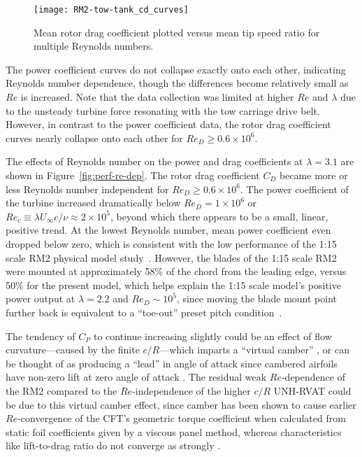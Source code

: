 \begin{figure}
    \centering

    \texttt{[image: RM2-tow-tank\_cd\_curves]}
    
    \caption{Mean rotor drag coefficient plotted versus mean tip speed ratio for
        multiple Reynolds numbers.}
    
    \label{fig:cd-curves}
\end{figure}

The power coefficient curves do not collapse exactly onto each other, indicating
Reynolds number dependence, though the differences become relatively small as
$Re$ is increased. Note that the data collection was limited at higher $Re$ and
$\lambda$ due to the unsteady turbine force resonating with the tow carriage
drive belt. However, in contrast to the power coefficient data, the rotor drag
coefficient curves nearly collapse onto each other for $Re_D \ge 0.6 \times
10^6$.

The effects of Reynolds number on the power and drag coefficients at
$\lambda=3.1$ are shown in Figure~\ref{fig:perf-re-dep}. The rotor drag
coefficient $C_D$ became more or less Reynolds number independent for $Re_D \ge
0.6 \times 10^6$. The power coefficient of the turbine increased dramatically
below $Re_D = 1 \times 10^6$ or $Re_c \equiv \lambda U_\infty c / \nu \approx 2
\times 10^5$, beyond which there appears to be a small, linear, positive trend.
At the lowest Reynolds number, mean power coefficient even dropped below zero,
which is consistent with the low performance of the 1:15 scale RM2 physical
model study~\cite{Hill2014}. However, the blades of the 1:15 scale RM2 were
mounted at approximately 58\% of the chord from the leading edge, versus 50\%
for the present model, which helps explain the 1:15 scale model's positive power
output at $\lambda=2.2$ and $Re_D \sim 10^5$, since moving the blade mount point
further back is equivalent to a ``toe-out'' preset pitch
condition~\cite{Fiedler2009}.

The tendency of $C_P$ to continue increasing slightly could be an effect of flow
curvature---caused by the finite $c/R$---which imparts a ``virtual camber''
\cite{Migliore1980}, or can be thought of as producing a ``lead'' in angle of
attack since cambered airfoils have non-zero lift at zero angle of attack
\cite{Goude2012}. The residual weak $Re$-dependence of the RM2 compared to the
$Re$-independence of the higher $c/R$ UNH-RVAT could be due to this virtual
camber effect, since camber has been shown to cause earlier $Re$-convergence of
the CFT's geometric torque coefficient when calculated from static foil
coefficients given by a viscous panel method, whereas characteristics like
lift-to-drag ratio do not converge as strongly \cite{Bachant2016-RVAT-Re-dep}.


